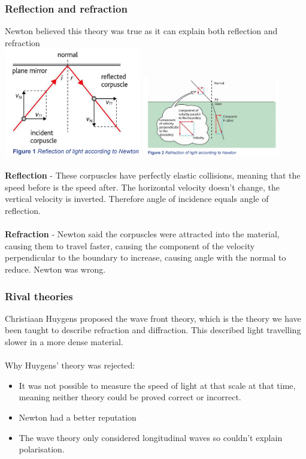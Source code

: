 \documentclass[12pt]{article}
\begin{document}
\subsubsection{Reflection and refraction}
Newton believed this theory was true as it can explain both reflection and refraction\\
\includegraphics[width=6cm]{reflection.png}
\includegraphics[width=6cm]{refraction.png}\\
\\
\textbf{Reflection} - These corpuscles have perfectly elastic collisions, meaning that the speed before is the speed after. The horizontal velocity doesn't change, the vertical velocity is inverted. Therefore angle of incidence equals angle of reflection.\\
\\
\textbf{Refraction} - Newton said the corpuscles were attracted into the material, causing them to travel faster, causing the component of the velocity perpendicular to the boundary to increase, causing angle with the normal to reduce. Newton was wrong.
\subsubsection{Rival theories}
Christiaan Huygens proposed the wave front theory, which is the theory we have been taught to describe refraction and diffraction. This described light travelling slower in a more dense material.\\
\\
Why Huygens' theory was rejected:
\begin{itemize}
\item It was not possible to measure the speed of light at that scale at that time, meaning neither theory could be proved correct or incorrect.
\item Newton had a better reputation
\item The wave theory only considered longitudinal waves so couldn't explain polarisation.
\end{itemize}
\end{document}
